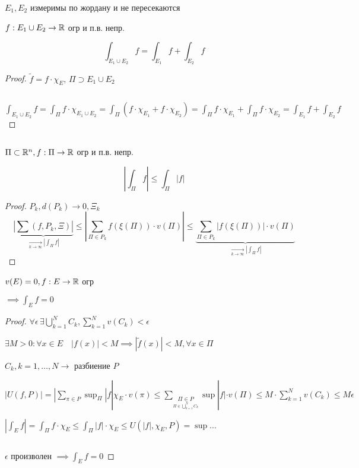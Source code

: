     \begin{lemma} %
        $E_1, E_2$ измеримы по жордану и не пересекаются

        $f: E_1 \cup E_2 \to \mathbb{R}$ огр и п.в. непр.

        $$\int_{E_1 \cup E_2} f = \int_{E_1} f + \int_{E_2} f$$
    \end{lemma}
    \begin{proof}
        $\widetilde{f} = f \cdot \chi_E, \, \Pi \supset E_1 \cup E_2$ 
        \par $ $

        $\displaystyle \int_{E_1 \cup E_2} f = 
        \int_\Pi f \cdot \chi_{E_1 \cup E_2} = 
        \int_\Pi (f \cdot \chi_{E_1} + f \cdot \chi_{E_2}) = 
        \int_\Pi f \cdot \chi_{E_1} + \int_\Pi f \cdot \chi_{E_2} =
        \int_{E_1} f + \int_{E_2} f
        $
    \end{proof}
    \par $ $

    \begin{lemma} %
        $\Pi \subset \mathbb{R}^n, f: \Pi \to \mathbb{R}$ огр и п.в. непр.

        $$\left|\int_\Pi f \right| \le \int_\Pi | f |$$
    \end{lemma}
    \begin{proof}
        $P_k, d(P_k) \to 0, \Xi_k$
        $$
        \underbrace{\left| \sum(f, P_k, \Xi) \right|}_{\xrightarrow[k \to \infty]{} |\int_\Pi f|} \le  
        \left| \sum_{\Pi \in P_k} f(\xi(\Pi)) \cdot v(\Pi) \right| \le 
        \underbrace{\sum_{\Pi \in P_k} \left| f(\xi(\Pi)) \right| \cdot v(\Pi) }_{
            \xrightarrow[k \to \infty]{} |\int_\Pi f|
        }
        $$
    \end{proof}
    \begin{lemma} %
        $v(E) = 0, f: E \to \mathbb{R}$ огр 

        $\implies \int_E f  = 0$
    \end{lemma}
    \begin{proof}
        $\displaystyle\forall \epsilon \, \exists \bigcup^N_{k=1}C_k, 
        \sum^N_{k=1}v(C_k) < \epsilon$

        $\exists M > 0: \forall x \in E \quad |f(x)| < M \implies 
        | \widetilde{f}(x) | < M, \forall x \in \Pi$

        $C_k, k=1, \dotsc, N \to$  разбиение $P$

        $\displaystyle
        | U(f, P) | = | \sum_{\pi \in P} \sup_\Pi |f|\chi_E \cdot v(\pi) \le 
        \sum_{\underset{\Pi \in \bigcup^N_{k=1} C_k}{\Pi \in P}} \sup |f|\cdot v(\Pi) \le
        M \cdot \sum^N_{k=1}v(C_k) \le M\epsilon$

        $|\int_E f| = \int_\Pi f\cdot\chi_E \le 
        \int_\Pi |f|\cdot \chi_E \le 
        U(|f|, \chi_E, P) = \sup ... $
        \par $ $

        $\epsilon$ произволен $\implies \int_E f = 0$
        
    \end{proof}


